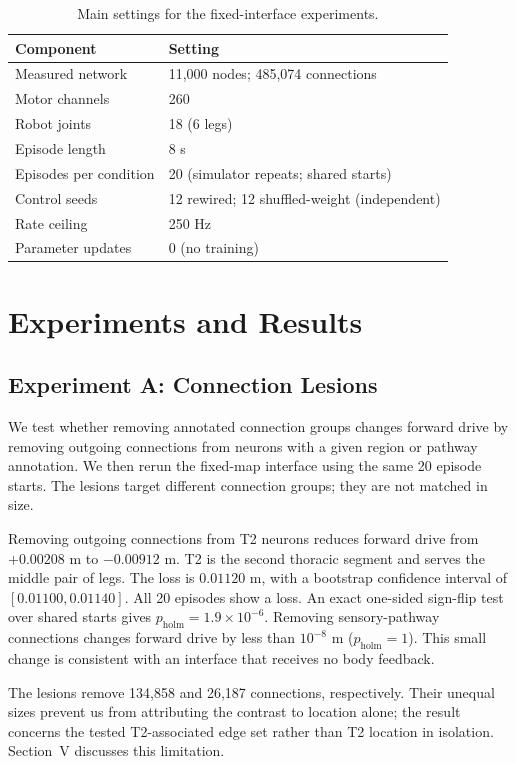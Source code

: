 \documentclass[conference]{IEEEtran}
\begin{document}
\begin{table}[t]
\caption{Main settings for the fixed-interface experiments.}
\label{tab:settings}
\centering
\scriptsize
\begin{tabular}{@{}ll@{}}
\toprule
Component & Setting\\
\midrule
Measured network & 11,000 nodes; 485,074 connections\\
Motor channels & 260\\
Robot joints & 18 (6 legs)\\
Episode length & 8 s\\
Episodes per condition & 20 (simulator repeats; shared starts)\\
Control seeds & 12 rewired; 12 shuffled-weight (independent)\\
Rate ceiling & 250 Hz\\
Parameter updates & 0 (no training)\\
\bottomrule
\end{tabular}
\end{table}

\section{Experiments and Results}

\subsection{Experiment A: Connection Lesions}
We test whether removing annotated connection groups changes forward drive by removing outgoing connections from neurons with a given region or pathway annotation. We then rerun the fixed-map interface using the same 20 episode starts. The lesions target different connection groups; they are not matched in size.

Removing outgoing connections from T2 neurons reduces forward drive from $+0.00208$ m to $-0.00912$ m. T2 is the second thoracic segment and serves the middle pair of legs. The loss is $0.01120$ m, with a bootstrap confidence interval of $[0.01100, 0.01140]$. All 20 episodes show a loss. An exact one-sided sign-flip test over shared starts gives $p_{\mathrm{holm}} = 1.9 \times 10^{-6}$. Removing sensory-pathway connections changes forward drive by less than $10^{-8}$ m ($p_{\mathrm{holm}} = 1$). This small change is consistent with an interface that receives no body feedback.

The lesions remove 134,858 and 26,187 connections, respectively. Their unequal sizes prevent us from attributing the contrast to location alone; the result concerns the tested T2-associated edge set rather than T2 location in isolation. Section~V discusses this limitation.
\end{document}
